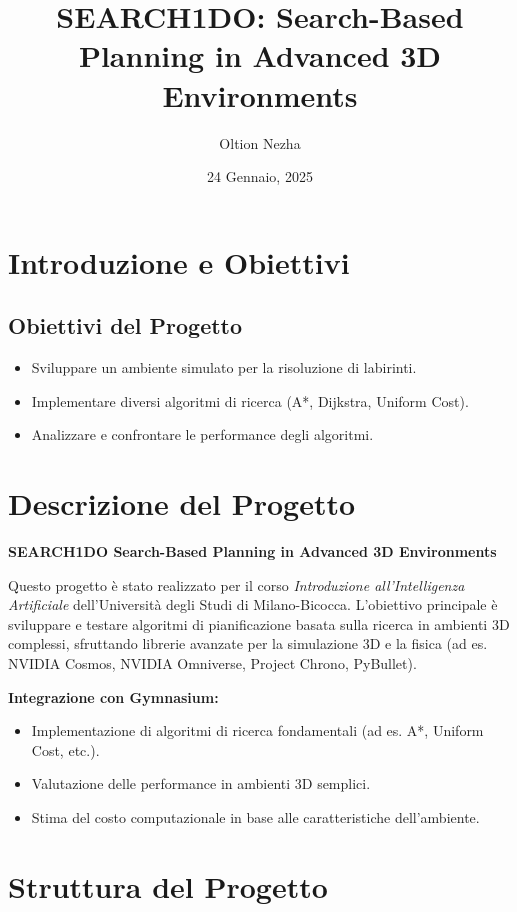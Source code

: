 \documentclass[12pt,a4paper]{article}
\title{SEARCH1DO: Search-Based Planning in Advanced 3D Environments}
\author{Oltion Nezha}
\date{24 Gennaio, 2025}
\begin{document}
\maketitle
\tableofcontents
\bigskip

\section{Introduzione e Obiettivi}
\subsection*{Obiettivi del Progetto}
\begin{itemize}
    \item Sviluppare un ambiente simulato per la risoluzione di labirinti.
    \item Implementare diversi algoritmi di ricerca (A*, Dijkstra, Uniform Cost).
    \item Analizzare e confrontare le performance degli algoritmi.
\end{itemize}

\section{Descrizione del Progetto}
\textbf{SEARCH1DO Search-Based Planning in Advanced 3D Environments}

Questo progetto è stato realizzato per il corso \textit{Introduzione all'Intelligenza Artificiale} dell'Università degli Studi di Milano-Bicocca. L'obiettivo principale è sviluppare e testare algoritmi di pianificazione basata sulla ricerca in ambienti 3D complessi, sfruttando librerie avanzate per la simulazione 3D e la fisica (ad es. NVIDIA Cosmos, NVIDIA Omniverse, Project Chrono, PyBullet).

\medskip
\textbf{Integrazione con Gymnasium:}
\begin{itemize}
    \item Implementazione di algoritmi di ricerca fondamentali (ad es. A*, Uniform Cost, etc.).
    \item Valutazione delle performance in ambienti 3D semplici.
    \item Stima del costo computazionale in base alle caratteristiche dell'ambiente.
\end{itemize}

\section{Struttura del Progetto}
\end{document}

